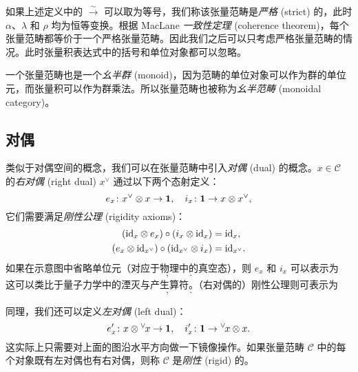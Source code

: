 如果上述定义中的 $\overset\sim\to$ 可以取为等号，我们称该张量范畴是\emph{严格} (strict) 的，此时 $\alpha$、$\lambda$ 和 $\rho$ 均为恒等变换。根据 MacLane \emph{一致性定理} (coherence theorem)，每个张量范畴都等价于一个严格张量范畴。因此我们之后可以只考虑严格张量范畴的情况。此时张量积表达式中的括号和单位对象都可以忽略。

一个张量范畴也是一个\emph{幺半群} (monoid)，因为范畴的单位对象可以作为群的单位元，而张量积可以作为群乘法。所以张量范畴也被称为\emph{幺半范畴} (monoidal category)。

\subsection{对偶}

类似于对偶空间的概念，我们可以在张量范畴中引入\emph{对偶} (dual) 的概念。$x\in\mathcal{C}$ 的\emph{右对偶} (right dual) $x^\vee$ 通过以下两个态射定义：
\begin{equation}
  e_x\colon x^\vee\otimes x\to\mathbf{1}, \quad i_x\colon\mathbf{1}\to x\otimes x^\vee,
\end{equation}
它们需要满足\emph{刚性公理} (rigidity axioms)：
\begin{equation}
  \begin{aligned}
    (\mathrm{id}_x\otimes e_x) \circ (i_x\otimes\mathrm{id}_x) &= \mathrm{id}_x, \\
    (e_x\otimes\mathrm{id}_{x^\vee}) \circ (\mathrm{id}_{x^\vee}\otimes i_x) &= \mathrm{id}_{x^\vee}.
  \end{aligned}
\end{equation}
如果在示意图中省略单位元（对应于物理中的真空态），则 $e_x$ 和 $i_x$ 可以表示为
\begin{equation}
  ,
  \qquad
  .
\end{equation}
这可以类比于量子力学中的湮灭与产生算符。（右对偶的）刚性公理则可表示为
\begin{equation}
  ,
  \qquad
  .
\end{equation}

同理，我们还可以定义\emph{左对偶} (left dual)：
\begin{equation}
  e'_x \colon x\otimes {}^\vee\mspace{-2mu}x\to\mathbf{1}, \quad i'_x\colon \mathbf{1}\to{}^\vee\mspace{-2mu}x\otimes x.
  \label{eq:left-dual}
\end{equation}
这实际上只需要对上面的图沿水平方向做一下镜像操作。如果张量范畴 $\mathcal{C}$ 中的每个对象既有左对偶也有右对偶，则称 $\mathcal{C}$ 是\emph{刚性} (rigid) 的。

